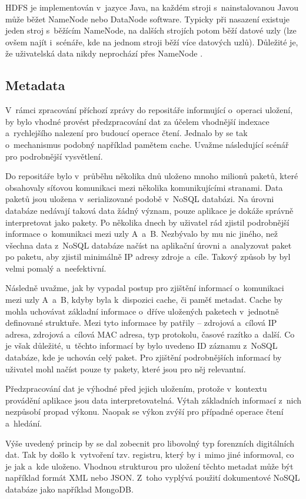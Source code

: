HDFS je implementován v~jazyce Java, na každém stroji s~nainstalovanou Javou může běžet NameNode nebo DataNode software. Typicky při nasazení existuje jeden stroj s~běžícím NameNode, na dalších strojích potom běží datové uzly (lze ovšem najít i~scénáře, kde na jednom stroji běží více datových uzlů). Důležité je, že uživatelská data nikdy neprochází přes NameNode \cite{apacheHDFSGuide}.

\subsection{Metadata} \label{metadata}
V~rámci zpracování příchozí zprávy do repositáře informující o~operaci uložení, by bylo vhodné provést předzpracování dat za účelem vhodnější indexace a~rychlejšího nalezení pro budoucí operace čtení. Jednalo by se tak o~mechanismus podobný například pamětem cache. Uvažme následující scénář pro podrobnější vysvětlení.

Do repositáře bylo v~průběhu několika dnů uloženo mnoho milionů paketů, které obsahovaly síťovou komunikaci mezi několika komunikujícími stranami. Data paketů jsou uložena v~serializované podobě v~NoSQL databázi. Na úrovni databáze nedávají taková data žádný význam, pouze aplikace je dokáže správně interpretovat jako pakety. Po několika dnech by uživatel rád zjistil podrobnější informace o~komunikaci mezi uzly A~a~B. Nezbývalo by mu nic jiného, než všechna data z~NoSQL databáze načíst na aplikační úrovni a~analyzovat paket po paketu, aby zjistil minimálně IP adresy zdroje a~cíle. Takový způsob by byl velmi pomalý a~neefektivní.

Následně uvažme, jak by vypadal postup pro zjištění informací o~komunikaci mezi uzly A~a~B, kdyby byla k~dispozici cache, či paměť metadat. Cache by mohla uchovávat základní informace o~dříve uložených paketech v~jednotně definované struktuře. Mezi tyto informace by patřily -- zdrojová a~cílová IP adresa, zdrojová a~cílová MAC adresa, typ protokolu, časové razítko a~další. Co je však důležité, u~těchto informací by bylo uvedeno ID záznamu z~NoSQL databáze, kde je uchován celý paket. Pro zjištění podrobnějších informací by uživatel mohl načíst pouze ty pakety, které jsou pro něj relevantní.

Předzpracování dat je výhodné před jejich uložením, protože v~kontextu provádění aplikace jsou data interpretovatelná. Výtah základních informací z~nich nezpůsobí propad výkonu. Naopak se výkon zvýší pro případné operace čtení a~hledání.

Výše uvedený princip by se dal zobecnit pro libovolný typ forenzních digitálních dat. Tak by došlo k~vytvoření tzv. registru, který by i~mimo jiné informoval, co je jak a~kde uloženo. Vhodnou strukturou pro uložení těchto metadat může být například formát XML nebo JSON. Z~toho vyplývá použití dokumentové NoSQL databáze jako například MongoDB.

